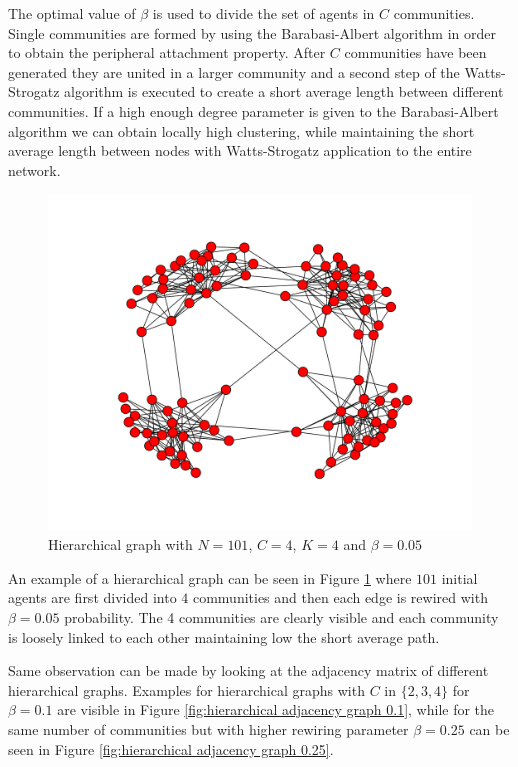 The optimal value of $\beta$ is used to divide the set of agents in $C$ communities.
Single communities are formed by using the Barabasi-Albert algorithm in order to obtain the peripheral attachment property.
After $C$ communities have been generated they are united in a larger community and a second step of the Watts-Strogatz algorithm is executed to create a short average length between different communities.
If a high enough degree parameter is given to the Barabasi-Albert algorithm we can obtain locally high clustering, while maintaining the short average length between nodes with Watts-Strogatz application to the entire network.

\begin{figure}[h]
\centering
\includegraphics[scale=0.4]{images/topology/hierarchical_graph_4_dot05.pdf}
\caption{Hierarchical graph with $N=101$, $C=4$, $K=4$ and $\beta = 0.05$}
\label{fig:hierarchical graph 4}
\end{figure}

An example of a hierarchical graph can be seen in Figure \ref{fig:hierarchical graph 4} where $101$ initial agents are first divided into $4$ communities and then each edge is rewired with $\beta=0.05$ probability. 
The 4 communities are clearly visible and each community is loosely linked to each other maintaining low the short average path.

Same observation can be made by looking at the adjacency matrix of different hierarchical graphs.
Examples for hierarchical graphs with $C$ in $\{2,3,4\}$ for $\beta=0.1$ are visible in Figure  \ref{fig:hierarchical adjacency graph 0.1}, while for the same number of communities but with higher rewiring parameter $\beta=0.25$ can be seen in Figure \ref{fig:hierarchical adjacency graph 0.25}.

